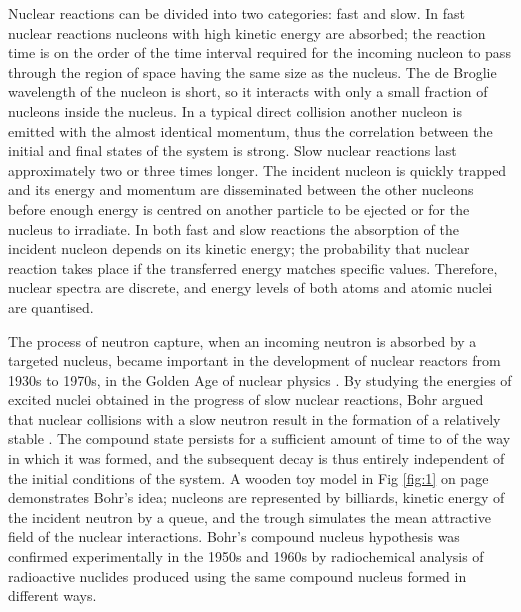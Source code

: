 Nuclear reactions can be divided into two categories: fast and slow. \cite{mehta} In fast nuclear reactions nucleons with high kinetic energy are absorbed; the reaction time is on the order of the time interval required for the incoming nucleon to pass through the region of space having the same size as the nucleus. The de Broglie wavelength of the nucleon is short, so it interacts with only a small fraction of nucleons inside the nucleus. In a typical direct collision another nucleon is emitted with the almost identical momentum, thus the correlation between the initial and final states of the system is strong. Slow nuclear reactions last approximately two or three times longer. The incident nucleon is quickly trapped and its energy and momentum are disseminated between the other nucleons before enough energy is centred on another particle to be ejected or for the nucleus to irradiate. In both fast and slow reactions the absorption of the incident nucleon depends on its kinetic energy; the probability that nuclear reaction takes place if the transferred energy matches specific values. Therefore, nuclear spectra are discrete, and energy levels of both atoms and atomic nuclei are quantised.

The process of neutron capture, when an incoming neutron is absorbed by a targeted nucleus, became important in the development of nuclear reactors from 1930s to 1970s, in the Golden Age of nuclear physics .\cite{firk} By studying the energies of excited nuclei obtained in the progress of slow nuclear reactions, Bohr argued that nuclear collisions with a slow neutron result in the formation of a relatively stable .\cite{bo36} The compound state persists for a sufficient amount of time to  of the way in which it was formed, and the subsequent decay is thus entirely independent of the initial conditions of the system. A wooden toy model in Fig \ref{fig:1} on page \pageref{fig:1} demonstrates Bohr's idea; nucleons are represented by billiards, kinetic energy of the incident neutron by a queue, and the trough simulates the mean attractive field of the nuclear interactions. Bohr's compound nucleus hypothesis was confirmed experimentally in the 1950s and 1960s by radiochemical analysis of radioactive nuclides produced using the same compound nucleus formed in different ways.\cite{hand}

